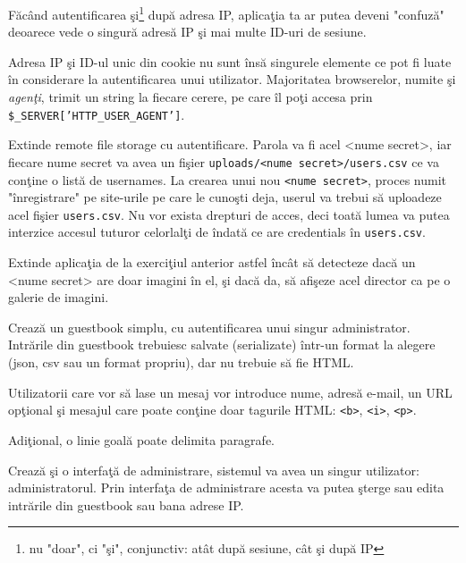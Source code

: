 Făcând autentificarea şi\footnote{nu "doar", ci "şi", conjunctiv: atât
după sesiune, cât şi după IP} după adresa IP, aplicaţia ta ar putea
deveni "confuză" deoarece vede o singură adresă IP şi mai multe
ID-uri de sesiune.

Adresa IP şi ID-ul unic din cookie nu sunt însă singurele elemente
ce pot fi luate în considerare la autentificarea unui utilizator.
Majoritatea browserelor, numite şi \textsl{agenţi}, trimit un string
la fiecare cerere, pe care îl poţi accesa prin \texttt{\$\_SERVER['HTTP\_USER\_AGENT']}.

\begin{Exercise}[title={O schemă de autentificare ieşită din comun},difficulty=2]
Extinde {\glqq}remote file storage{\grqq} cu autentificare.
Parola va fi acel {\glqq}<nume secret>{\grqq}, iar fiecare {\glqq}nume
secret{\grqq} va avea un fişier \texttt{uploads/<nume secret>/users.csv}
ce va conţine o listă de usernames. La crearea unui nou \texttt{<nume secret>},
proces numit "înregistrare" pe site-urile pe care le cunoşti deja,
userul va trebui să uploadeze acel fişier \texttt{users.csv}. Nu vor exista
drepturi de acces, deci toată lumea va putea interzice accesul tuturor celorlalţi
de \^indată ce are credentials \^in \texttt{users.csv}.
\end{Exercise}

\begin{Exercise}[title={Remote file storage cu galerie de imagini}]
Extinde aplicaţia de la exerciţiul anterior astfel încât să detecteze
dacă un {\glqq}<nume secret>{\grqq} are doar imagini în el, şi dacă
da, să afişeze acel director ca pe o galerie de imagini.
\end{Exercise}

\begin{Exercise}[title={Guestbook I},difficulty=2]
Crează un guestbook simplu, cu autentificarea unui singur
administrator. Intrările din guestbook trebuiesc salvate (serializate)
într-un format la alegere (json, csv sau un format propriu), dar
nu trebuie să fie HTML.

Utilizatorii care vor să lase un mesaj vor introduce nume, adresă e-mail, un 
URL opţional şi mesajul care poate conţine doar tagurile HTML:
\texttt{<b>}, \texttt{<i>}, \texttt{<p>}.

Adiţional, o linie goală poate delimita paragrafe.

Crează şi o interfaţă de administrare, sistemul va avea un singur utilizator:
administratorul. Prin interfaţa de administrare acesta va putea şterge sau edita
intrările din guestbook sau bana adrese IP.
\end{Exercise}

